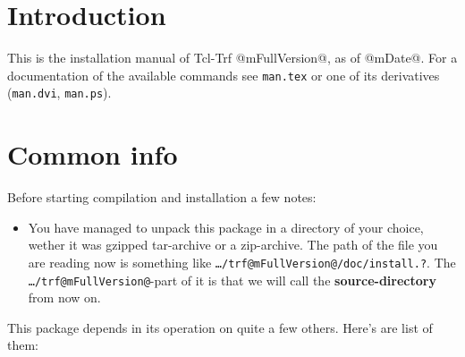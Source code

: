 \def\strong#1{{\bf #1}}
\def\lang#1{{\tt #1}}
\def\file#1{{\tt #1}}
\def\arg#1{{\tt $<$#1$>$}}
\def\trf{\strong {trf}}
\def\tcl{\lang {tcl}}
\def\tclsh{\cmd {tclsh}}
\def\wish{\cmd {wish}}
\def\cmd#1{{\tt #1}}
\def\opt#1{{\tt #1}}
\def\var#1{{\tt #1}}
\def\man#1{{\tt #1}}
\def\lib#1{{\tt #1}}
\def\url#1{{\tt #1}}
\def\tm{$^{\mbox{{\tiny (tm)}}}$}
\def\ra{$\rightarrow$}
\def\eq{$\equiv$}
\def\dos{{\tt DOS}}
\def\win{{\tt Windows\tm{}}}
\def\winnt{{\tt Windows NT\tm{}}}

\def\version{1.0}

\tableofcontents

\chapter {Introduction}
This is the installation manual of Tcl-Trf @mFullVersion@, as of
@mDate@. For a documentation of the available commands see \file
{man.tex} or one of its derivatives (\file {man.dvi}, \file
{man.ps}).


\chapter {Common info}

Before starting compilation and installation a few notes:

\begin{itemize}
\item	You have managed to unpack this package in a directory of
	your choice, wether it was gzipped tar-archive or a
	zip-archive. The path of the file you are reading now is
	something like \file {\dots{}/trf@mFullVersion@/doc/install.?}.
	The \file {\dots{}/trf@mFullVersion@}-part of it is that we will
	call the \strong {source-directory} from now on.
\end{itemize}

This package depends in its operation on quite a few others. Here's
are list of them:


